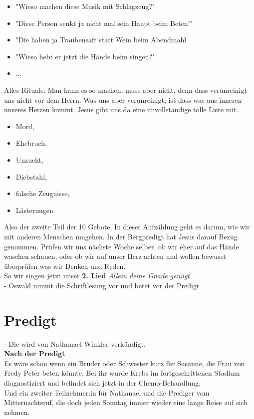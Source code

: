 \documentclass[12pt,a4paper]{scrarticle}
\begin{document}
\begin{itemize}
    \item "Wieso machen diese Musik mit Schlagzeug?" 
    \item "Diese Person senkt ja nicht mal sein Haupt beim Beten!"
    \item "Die haben ja Traubensaft statt Wein beim Abendmahl
    \item "Wieso hebt er jetzt die Hände beim singen?"
    \item ...
\end{itemize}
Alles Rituale. Man kann es so machen, muss aber nicht, denn dass verunreinigt uns nicht vor dem Herrn. 
Was uns aber verunreinigt, ist dass was aus inneren unseres Herzen kommt. Jesus gibt uns da eine unvollständige tolle Liste mit.
\begin{itemize}
    \item Mord, 
    \item Ehebruch, 
    \item Unzucht, 
    \item Diebstahl, 
    \item falsche Zeugnisse, 
    \item Lästerungen
\end{itemize}
Also der zweite Teil der 10 Gebote. In dieser Aufzählung geht es darum, wie wir mit anderen Menschen umgehen. In der Bergpredigt hat Jesus darauf Bezug genommen. Prüfen wir uns nächste Woche selber, ob wir eher auf das Hände waschen schauen, oder ob wir auf unser Herz achten und wollen bewusst überprüfen was wir Denken und Reden.
\\ So wir singen jetzt unser \textbf{2. Lied} \textit{Allein deine Gnade genügt}\\

- Oswald nimmt die Schriftlesung vor und betet vor der Predigt

\section{Predigt}
- Die wird von Nathanael Winkler verkündigt.\\

\textbf{Nach der Predigt}\\
Es wäre schön wenn ein Bruder oder Schwester kurz für Susanne, die Frau von Fredy Peter beten könnte. 
Bei ihr wurde Krebs im fortgeschrittenen Stadium diagnostiziert und befindet sich jetzt in der Chemo-Behandlung.\\

Und ein zweiter Teilnehmer:in für Nathanael und die Prediger vom Mitternachtsruf, die doch jeden Sonntag immer wieder eine lange Reise auf sich nehmen.\\
\end{document}
